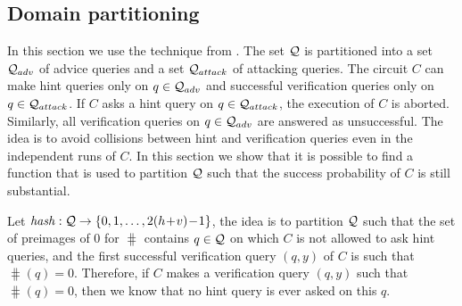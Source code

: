 %
\subsection{Domain partitioning}
\label{st:domain_partition}
In this section we use the technique from \cite{dodis2009security}.
The set $\mathcal{Q}$ is partitioned into a set $\mathcal{Q}_{adv}$ of advice queries and a set $\mathcal{Q}_{attack}$ of attacking queries.
The circuit $C$ can make hint queries only on $q \in \mathcal{Q}_{adv}$ and successful verification queries only on $q \in \mathcal{Q}_{attack}$.
If $C$ asks a hint query on $q \in \mathcal{Q}_{attack}$, the execution of $C$ is aborted.
Similarly, all verification queries on $q \in \mathcal{Q}_{adv}$ are answered as unsuccessful.
The idea is to avoid collisions between hint and verification queries even in the independent runs of $C$.
In this section we show that it is possible to find a function that is used to partition $\mathcal{Q}$
such that the success probability of $C$ is still substantial.

Let $\operatorname{\mathit{hash}}:\mathcal{Q}\rightarrow\{0,1,\dots, 2(h\!+\!v)\!-\!1\}$, the idea is to partition $\mathcal{Q}$ such that the set of preimages
of $0$ for $\hash$ contains $q \in \mathcal{Q}$ on which $C$ is not allowed to ask hint queries,
and the first successful verification query $(q,y)$ of $C$ is such that $\hash(q) = 0$.
Therefore, if $C$ makes a verification query $(q,y)$ such that $\hash(q) = 0$, then we know that no hint query is ever asked on this $q$.

